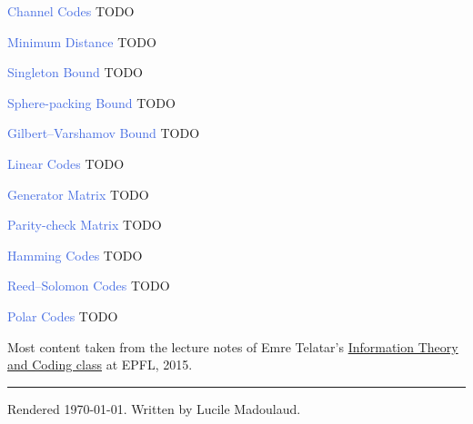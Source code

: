 \documentclass[10pt,a4paper,landscape]{article}
\newcommand{\concept}[1]{\textcolor{RoyalBlue}{#1}}
\renewcommand{\section}[1]{
    \vspace{-0.3cm}
    \begin{center}
      \color{Bittersweet}
      \hrulefill{\small~~#1~~}\hrulefill
    \end{center}
    \vspace{-0.3cm}
  }
\begin{document}
\begin{multicols*}{4}
\concept{Channel Codes} TODO
 
\concept{Minimum Distance} TODO
 
\concept{Singleton Bound} TODO
 
\concept{Sphere-packing Bound} TODO
 
\concept{Gilbert–Varshamov Bound} TODO

\concept{Linear Codes} TODO
 
\concept{Generator Matrix} TODO
 
\concept{Parity-check Matrix} TODO
 
\concept{Hamming Codes} TODO

\concept{Reed–Solomon Codes} TODO

\concept{Polar Codes} TODO

\ifdefined \longversion %
\else \newpage
\fi



\section{Credits}
Most content taken from the lecture notes of Emre Telatar's \href{http://ipg.epfl.ch/doku.php?id=en:courses:2015-2016:itc}{Information Theory and Coding class} at EPFL, 2015.

\vspace{0.5cm}
\hrule
\vspace{0.5cm}
\tiny
Rendered \today. Written by Lucile Madoulaud.

\end{multicols*}
\end{document}
